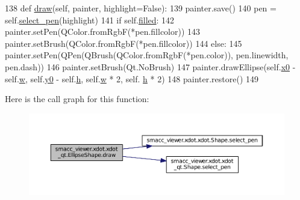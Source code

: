 \begin{DoxyCode}
138     \textcolor{keyword}{def }\hyperlink{classsmacc__viewer_1_1xdot_1_1xdot__qt_1_1EllipseShape_ae098d2bafa7a1aac383cd730ee4bdb33}{draw}(self, painter, highlight=False):
139         painter.save()
140         pen = self.\hyperlink{classsmacc__viewer_1_1xdot_1_1xdot__qt_1_1Shape_a7f20c9ecdb3c6117b8d1185c8155b122}{select\_pen}(highlight)
141         \textcolor{keywordflow}{if} self.\hyperlink{classsmacc__viewer_1_1xdot_1_1xdot__qt_1_1EllipseShape_adb6b248e82c0cc5e2bf9338e7faa6196}{filled}:
142             painter.setPen(QColor.fromRgbF(*pen.fillcolor))
143             painter.setBrush(QColor.fromRgbF(*pen.fillcolor))
144         \textcolor{keywordflow}{else}:
145             painter.setPen(QPen(QBrush(QColor.fromRgbF(*pen.color)), pen.linewidth, pen.dash))
146             painter.setBrush(Qt.NoBrush)
147         painter.drawEllipse(self.\hyperlink{classsmacc__viewer_1_1xdot_1_1xdot__qt_1_1EllipseShape_abdb288715129f85135c3e419a9e12959}{x0} - self.\hyperlink{classsmacc__viewer_1_1xdot_1_1xdot__qt_1_1EllipseShape_abce028ffaabc33b92349dc8ee873f7e1}{w}, self.\hyperlink{classsmacc__viewer_1_1xdot_1_1xdot__qt_1_1EllipseShape_a614b6db830bef05d87ca2dd403401e11}{y0} - self.\hyperlink{classsmacc__viewer_1_1xdot_1_1xdot__qt_1_1EllipseShape_af9e9fe2972e06665badea52e53685968}{h},  self.\hyperlink{classsmacc__viewer_1_1xdot_1_1xdot__qt_1_1EllipseShape_abce028ffaabc33b92349dc8ee873f7e1}{w} * 2,  self.
      \hyperlink{classsmacc__viewer_1_1xdot_1_1xdot__qt_1_1EllipseShape_af9e9fe2972e06665badea52e53685968}{h} * 2)
148         painter.restore()
149 
\end{DoxyCode}


Here is the call graph for this function\+:
\nopagebreak
\begin{figure}[H]
\begin{center}
\leavevmode
\includegraphics[width=350pt]{classsmacc__viewer_1_1xdot_1_1xdot__qt_1_1EllipseShape_ae098d2bafa7a1aac383cd730ee4bdb33_cgraph}
\end{center}
\end{figure}




